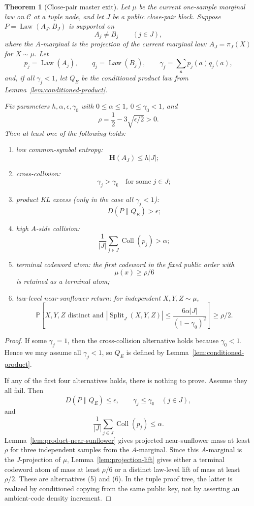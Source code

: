 \documentclass[11pt]{article}
\newtheorem{theorem}{Theorem}[section]
\newcommand{\C}{\mathcal C}
\newcommand{\Prb}{\mathbb P}
\newcommand{\bfH}{\mathbf H}
\newcommand{\Coll}{\operatorname{Coll}}
\newcommand{\Split}{\operatorname{Split}}
\newcommand{\Law}{\operatorname{Law}}
\begin{document}
\begin{theorem}[Close-pair master exit]
\label{thm:close-pair-exit}
Let $\mu$ be the current one-sample marginal law on $\C$ at a tuple node, and
let $J$ be a public close-pair block.  Suppose $P=\Law(A_J,B_J)$ is supported on
\[
  A_j\ne B_j\qquad(j\in J),
\]
where the $A$-marginal is the projection of the current marginal law:
$A_J=\pi_J(X)$ for $X\sim\mu$.  Let
\[
  p_j=\Law(A_j),\qquad q_j=\Law(B_j),\qquad
  \gamma_j=\sum_a p_j(a)q_j(a),
\]
and, if all $\gamma_j<1$, let $Q_E$ be the conditioned product law from
Lemma~\ref{lem:conditioned-product}.

Fix parameters $h,\alpha,\epsilon,\gamma_0$ with $0\le\alpha\le 1$,
$0\le\gamma_0<1$, and
\[
  \rho=\frac12-3\sqrt{\epsilon/2}>0.
\]
Then at least one of the following holds:
\begin{enumerate}[label=\textup{(\arabic*)}]
\item low common-symbol entropy:
  \[
    \bfH(A_J)\le h|J|;
  \]
\item cross-collision:
  \[
    \gamma_j>\gamma_0\quad\text{for some }j\in J;
  \]
\item product KL excess (only in the case all $\gamma_j<1$):
  \[
    D(P\|Q_E)>\epsilon;
  \]
\item high $A$-side collision:
  \[
    \frac1{|J|}\sum_{j\in J}\Coll(p_j)>\alpha;
  \]
\item terminal codeword atom:
  the first codeword in the fixed public order with
  \[
    \mu(x)\ge \rho/6
  \]
  is retained as a terminal atom;
\item law-level near-sunflower return:
  for independent $X,Y,Z\sim\mu$,
  \[
    \Prb\!\left[
      X,Y,Z\text{ distinct and }
      |\Split_J(X,Y,Z)|
      \le
      \frac{6\alpha |J|}{(1-\gamma_0)^2}
    \right]
    \ge \rho/2.
  \]
\end{enumerate}
\end{theorem}

\begin{proof}
If some $\gamma_j=1$, then the cross-collision alternative holds because
$\gamma_0<1$.  Hence we may assume all $\gamma_j<1$, so $Q_E$ is defined by
Lemma~\ref{lem:conditioned-product}.

If any of the first four alternatives holds, there is nothing to prove.
Assume they all fail.  Then
\[
  D(P\|Q_E)\le\epsilon,\qquad
  \gamma_j\le\gamma_0\quad(j\in J),
\]
and
\[
  \frac1{|J|}\sum_{j\in J}\Coll(p_j)\le\alpha.
\]
Lemma~\ref{lem:product-near-sunflower} gives projected near-sunflower mass at
least $\rho$ for three independent samples from the $A$-marginal.  Since this
$A$-marginal is the $J$-projection of $\mu$, Lemma~\ref{lem:projection-lift}
gives either a terminal codeword atom of mass at least $\rho/6$ or a distinct
law-level lift of mass at least $\rho/2$.  These are alternatives (5) and
(6).  In the tuple proof tree, the latter is realized by conditioned copying
from the same public key, not by asserting an ambient-code density increment.
\end{proof}
\end{document}
